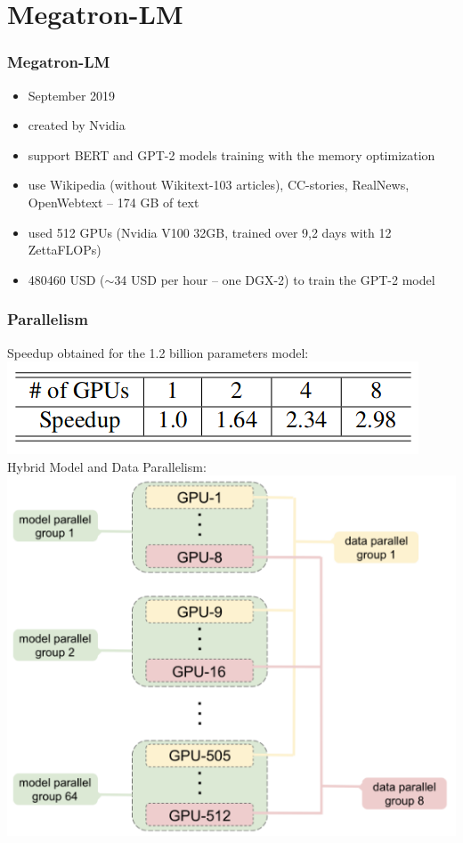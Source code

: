 \documentclass{beamer}
\begin{document}
\section{Megatron-LM}
\begin{frame}
    \frametitle{Megatron-LM \cite{megatronlm}}
    \begin{itemize}
        \item September 2019
        \item created by Nvidia
        \item support BERT and GPT-2 models training with the memory optimization
        \item use Wikipedia (without Wikitext-103 articles), CC-stories, RealNews, OpenWebtext -- 174 GB of text
        \item used 512 GPUs (Nvidia V100 32GB, trained over 9,2 days with 12 ZettaFLOPs)
        \item 480460 USD ($\sim$34 USD per hour -- one DGX-2) to train the GPT-2 model
    \end{itemize}
\end{frame}

\begin{frame}
    \frametitle{Parallelism}
    \begin{center}
        Speedup obtained for the 1.2 billion parameters model: \\
        \includegraphics[scale=1.0]{img/megatron-lm-speedup.png} \\
        Hybrid Model and Data Parallelism: \\
        \includegraphics[scale=1.0]{img/megatron-lm-parallel.png}
    \end{center}
\end{frame}
\end{document}
